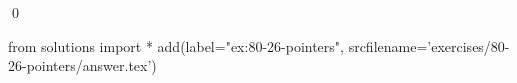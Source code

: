 
\begin{ex}
  \label{ex:80-26-pointers}
  
  \qed
\end{ex}
\begin{python0}
from solutions import *
add(label="ex:80-26-pointers",
    srcfilename='exercises/80-26-pointers/answer.tex')
\end{python0}
